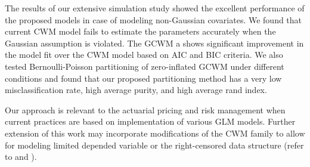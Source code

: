 \documentclass[11pt,letterpaper]{article}
\numberwithin{equation}{section}
\numberwithin{equation}{section}
\numberwithin{equation}{section}
\begin{document}
The results of our extensive simulation study showed the excellent performance of the proposed models in case of modeling non-Gaussian covariates. We found  that current CWM model fails to estimate the parameters accurately when the Gaussian assumption is violated. The GCWM a shows significant improvement in the model fit over the CWM model based on AIC and BIC criteria. We also tested Bernoulli-Poisson partitioning of zero-inflated GCWM under different conditions and found that our proposed partitioning method has a very low misclassification rate, high average purity, and high average rand index.

Our approach is relevant to the actuarial pricing and risk management when current practices are based on implementation of various GLM models. Further extension of this work may incorporate modifications of the CWM family to allow for modeling limited depended variable or the right-censored data structure (refer to \cite{miljkovic2015} and \cite{miljkovic+orr:2017}).



\appendix
\end{document}
